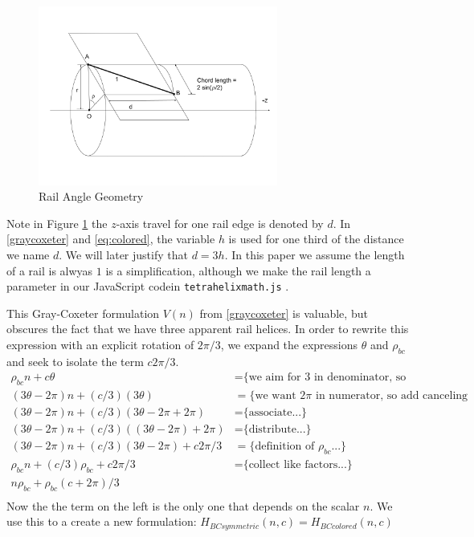\documentclass[11pt]{article}
\begin{document}
\begin{figure}[H]
  \label{railanglefig}
     \centering
     \includegraphics[width=0.7\textwidth]{figures/RailAngleGeometry.png}
     \caption{Rail Angle Geometry}
\end{figure}

Note in Figure \ref{railanglefig} the $z$-axis travel for one rail edge is denoted by $d$. In \eqref{graycoxeter} and \eqref{eq:colored}, the variable
$h$ is used for one third of the distance we name $d$. We will later justify that $d = 3h$. In this paper we assume the length of a rail
is alwyas $1$ is a simplification, although we make the rail length a parameter in our JavaScript codein \texttt{tetrahelixmath.js} \cite{readtetrahelix}.

This Gray-Coxeter formulation $V(n)$ from \eqref{graycoxeter} is valuable, but obscures the fact that we have three
apparent rail helices.
In order to rewrite this expression with an explicit rotation of $2\pi/3$, we expand 
the expressions $\theta$ and $\rho_{bc}$ and seek to isolate the term $c2\pi/3 $.
\begin{align*}
  \rho_{bc} n + c \theta  &=   \text{\{we aim for 3 in denominator, so we split...\}} \\
    (3 \theta - 2 \pi)n + (c/3)  (3 \theta)  &=   \text{\{we want $2\pi$ in numerator, so add canceling terms...\}} \\
  (3 \theta - 2 \pi)n + (c/ 3) (3 \theta - 2 \pi  + 2 \pi) &=  \text{\{associate...\}} \\
  (3 \theta - 2 \pi)n + (c/ 3) ((3 \theta - 2 \pi)  + 2 \pi) &=  \text{\{distribute...\}} \\  
  (3 \theta - 2 \pi)n + (c / 3) (3 \theta - 2 \pi)  + c 2 \pi /3 &=  \text{\{definition of $\rho_{bc}$...\}} \\
  \rho_{bc} n + (c / 3) \rho_{bc}  + c 2 \pi /3 &=  \text{\{collect like factors...\}} \\  
  n \rho_{bc}  +\rho_{bc} ( c+  2 \pi) /3  \\
\end{align*}
Now the the term on the left is the only one that depends on the scalar $n$. We use this to a create
a new formulation: $H_{BCsymmetric}(n,c) = H_{BCcolored}(n,c)$
\end{document}
